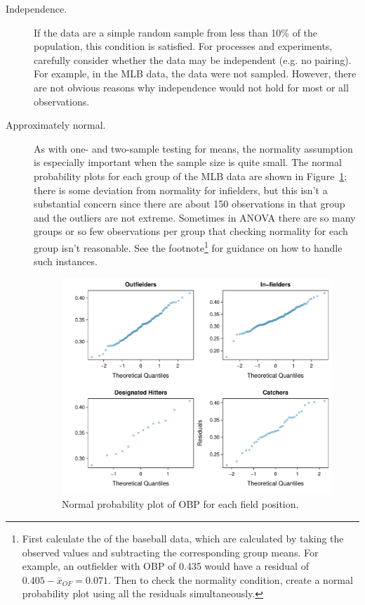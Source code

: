\begin{description}
\item[Independence.] If the data are a simple random sample from less than 10\% of the population, this condition is satisfied. For processes and experiments, carefully consider whether the data may be independent (e.g. no pairing). For example, in the MLB data, the data were not sampled. However, there are not obvious reasons why independence would not hold for most or all observations.
\item[Approximately normal.] As with one- and two-sample testing for means, the normality assumption is especially important when the sample size is quite small. The normal probability plots for each group of the MLB data are shown in Figure~\ref{mlbANOVADiagNormalityGroups}; there is some deviation from normality for infielders, but this isn't a substantial concern since there are about 150 observations in that group and the outliers are not extreme. Sometimes in ANOVA there are so many groups or so few observations per group that checking normality for each group isn't reasonable. See the footnote\footnote{First calculate the  of the baseball data, which are calculated by taking the observed values and subtracting the corresponding group means. For example, an outfielder with OBP of 0.435 would have a residual of $0.405 - \bar{x}_{OF} = 0.071$. Then to check the normality condition, create a normal probability plot using all the residuals simultaneously.} for guidance on how to handle such instances.

\begin{figure}[hhh]
\centering
\includegraphics[width=\textwidth]{05/figures/mlbANOVA/mlbANOVADiagNormalityGroups}
\caption{Normal probability plot of OBP for each field position.}
\label{mlbANOVADiagNormalityGroups}
\end{figure}


\end{description}
